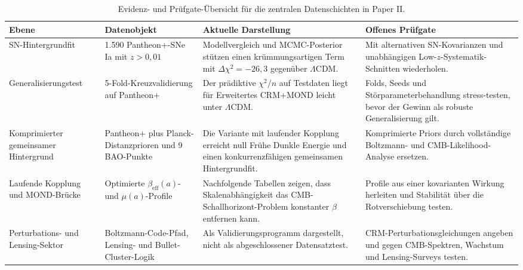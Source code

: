 \documentclass[aps,prd,twocolumn,superscriptaddress,nofootinbib]{revtex4-2}
\begin{document}
\begin{table}[t]
\centering
\caption{Evidenz- und Prüfgate-Übersicht für die zentralen Datenschichten in Paper II.}
\label{tab:evidenz_gate_ledger}
\footnotesize
\begin{tabular}{@{}llll@{}}
\toprule
\parbox[t]{0.17\textwidth}{\raggedright \textbf{Ebene}} & \parbox[t]{0.21\textwidth}{\raggedright \textbf{Datenobjekt}} & \parbox[t]{0.26\textwidth}{\raggedright \textbf{Aktuelle Darstellung}} & \parbox[t]{0.24\textwidth}{\raggedright \textbf{Offenes Prüfgate}} \\
\midrule
\parbox[t]{0.17\textwidth}{\raggedright SN-Hintergrundfit} & \parbox[t]{0.21\textwidth}{\raggedright 1.590 Pantheon+-SNe Ia mit $z>0{,}01$} & \parbox[t]{0.26\textwidth}{\raggedright Modellvergleich und MCMC-Posterior stützen einen krümmungsartigen Term mit $\Delta\chi^2=-26{,}3$ gegenüber $\Lambda$CDM.} & \parbox[t]{0.24\textwidth}{\raggedright Mit alternativen SN-Kovarianzen und unabhängigen Low-$z$-Systematik-Schnitten wiederholen.} \\
\parbox[t]{0.17\textwidth}{\raggedright Generalisierungstest} & \parbox[t]{0.21\textwidth}{\raggedright 5-Fold-Kreuzvalidierung auf Pantheon+} & \parbox[t]{0.26\textwidth}{\raggedright Der prädiktive $\chi^2/n$ auf Testdaten liegt für Erweitertes CRM+MOND leicht unter $\Lambda$CDM.} & \parbox[t]{0.24\textwidth}{\raggedright Folds, Seeds und Störparameterbehandlung stress-testen, bevor der Gewinn als robuste Generalisierung gilt.} \\
\parbox[t]{0.17\textwidth}{\raggedright Komprimierter gemeinsamer Hintergrund} & \parbox[t]{0.21\textwidth}{\raggedright Pantheon+ plus Planck-Distanzprioren und 9 BAO-Punkte} & \parbox[t]{0.26\textwidth}{\raggedright Die Variante mit laufender Kopplung erreicht null Frühe Dunkle Energie und einen konkurrenzfähigen gemeinsamen Hintergrundfit.} & \parbox[t]{0.24\textwidth}{\raggedright Komprimierte Priors durch vollständige Boltzmann- und CMB-Likelihood-Analyse ersetzen.} \\
\parbox[t]{0.17\textwidth}{\raggedright Laufende Kopplung und MOND-Brücke} & \parbox[t]{0.21\textwidth}{\raggedright Optimierte $\beta_{\mathrm{eff}}(a)$- und $\mu(a)$-Profile} & \parbox[t]{0.26\textwidth}{\raggedright Nachfolgende Tabellen zeigen, dass Skalenabhängigkeit das CMB-Schallhorizont-Problem konstanter $\beta$ entfernen kann.} & \parbox[t]{0.24\textwidth}{\raggedright Profile aus einer kovarianten Wirkung herleiten und Stabilität über die Rotverschiebung testen.} \\
\parbox[t]{0.17\textwidth}{\raggedright Perturbations- und Lensing-Sektor} & \parbox[t]{0.21\textwidth}{\raggedright Boltzmann-Code-Pfad, Lensing- und Bullet-Cluster-Logik} & \parbox[t]{0.26\textwidth}{\raggedright Als Validierungsprogramm dargestellt, nicht als abgeschlossener Datensatztest.} & \parbox[t]{0.24\textwidth}{\raggedright CRM-Perturbationsgleichungen angeben und gegen CMB-Spektren, Wachstum und Lensing-Surveys testen.} \\
\bottomrule
\end{tabular}
\end{table}
\end{document}
